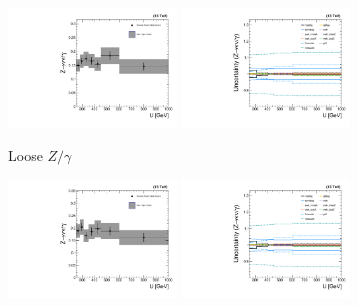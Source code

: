 \begin{figure}[]
    \begin{center}
        \begin{subfigure}[t]{0.49\textwidth}
            \includegraphics[width=0.49\textwidth]{figures/monotop/xfer/rfactor_photon_loose.pdf}
            \includegraphics[width=0.49\textwidth]{figures/monotop/uncertainties/variations_photon_loose.pdf}
            \caption{Loose $Z/\gamma$}
        \end{subfigure}
        \begin{subfigure}[t]{0.49\textwidth}
            \includegraphics[width=0.49\textwidth]{figures/monotop/xfer/rfactor_photon.pdf}
            \includegraphics[width=0.49\textwidth]{figures/monotop/uncertainties/variations_photon.pdf}

\end{subfigure}
\end{center}
\end{figure}

